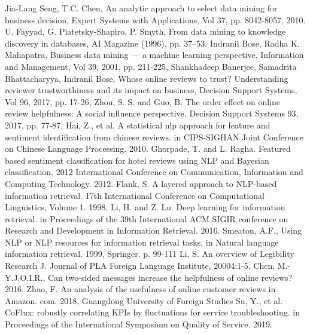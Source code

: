 \documentclass{mcmthesis}
\begin{document}
\begin{thebibliography}{99}
 Jia-Lang Seng, T.C. Chen, An analytic approach to select data mining for business decision, Expert Systems with Applications,
Vol 37, pp. 8042-8057, 2010.
 U. Fayyad, G. Piatetsky-Shapiro, P. Smyth, From data mining to knowledge discovery in databases, AI Magazine (1996), pp. 37–53.
 Indranil Bose, Radha K. Mahapatra,
Business data mining — a machine learning perspective, Information and Management, Vol 39, 2001, pp. 211-225,
 Shankhadeep Banerjee, Samadrita Bhattacharyya, Indranil Bose, Whose online reviews to trust? Understanding reviewer trustworthiness and its impact on business, Decision Support Systems, Vol 96, 2017, pp. 17-26,
 Zhou, S. S. and Guo, B. The order effect on online review helpfulness: A social influence perspective. Decision Support Systems 93, 2017, pp. 77-87. 
 Hai, Z., et al. A statistical nlp approach for feature and sentiment identification from chinese reviews. in CIPS-SIGHAN Joint Conference on Chinese Language Processing. 2010.
 Ghorpade, T. and L. Ragha. Featured based sentiment classification for hotel reviews using NLP and Bayesian classification. 2012 International Conference on Communication, Information and Computing Technology. 2012.
 Flank, S. A layered approach to NLP-based information retrieval. 17th International Conference on Computational Linguistics, Volume 1. 1998.
 Li, H. and Z. Lu. Deep learning for information retrieval. in Proceedings of the 39th International ACM SIGIR conference on Research and Development in Information Retrieval. 2016.
 Smeaton, A.F., Using NLP or NLP resources for information retrieval tasks, in Natural language information retrieval. 1999, Springer. p. 99-111
  Li, S. An overview of Legibility Research J. Journal of PLA Foreign Language Institute, 20004:1-5.
 Chen, M.-Y.J.O.I.R., Can two-sided messages increase the helpfulness of online reviews? 2016.
 Zhao, F. An analysis of the usefulness of online customer reviews in Amazon. com. 2018, Guangdong University of Foreign Studies
 Su, Y., et al. CoFlux: robustly correlating KPIs by fluctuations for service troubleshooting. in Proceedings of the International Symposium on Quality of Service. 2019.

\end{thebibliography}
\end{document}
